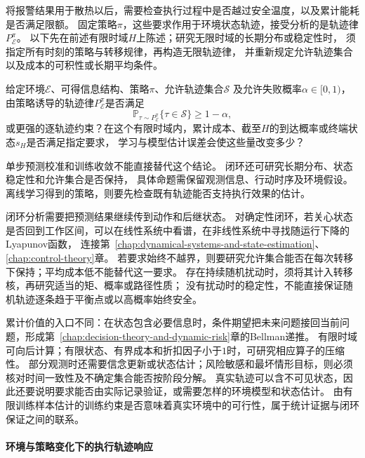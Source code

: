 将报警结果用于散热以后，需要检查执行过程中是否越过安全温度，以及累计能耗是否满足限额。
固定策略$\pi$，这些要求作用于环境状态轨迹，接受分析的是轨迹律$P_{\mathcal E}^{\pi}$。
以下先在前述有限时域$H$上陈述；研究无限时域的长期分布或稳定性时，
须指定所有时刻的策略与转移规律，再构造无限轨迹律，
并重新规定允许轨迹集合以及成本的可积性或长期平均条件。

\begin{mathproblem}[闭环轨迹能否满足长期要求]
  \label{question:future-closed-loop}
  给定环境$\mathcal E$、可得信息结构、策略$\pi$、允许轨迹集合$\mathcal S$
  及允许失败概率$\alpha\in[0,1)$，
  由策略诱导的轨迹律$P_{\mathcal E}^{\pi}$是否满足
  \[
    \mathbb P_{\tau\sim P_{\mathcal E}^{\pi}}\{\tau\in\mathcal S\}
    \geq1-\alpha,
  \]
  或更强的逐轨迹约束？在这个有限时域内，累计成本、截至$H$的到达概率或终端状态$s_H$是否满足指定要求，
  学习与模型估计误差会使这些量改变多少？
\end{mathproblem}

单步预测校准和训练收敛不能直接替代这个结论。
闭环还可研究长期分布、状态稳定性和允许集合是否保持，
具体命题需保留观测信息、行动时序及环境假设。
离线学习得到的策略，则要先检查既有轨迹能否支持执行效果的估计。

闭环分析需要把预测结果继续传到动作和后继状态。
对确定性闭环，若关心状态是否回到工作区间，可以在线性系统中看谱，在非线性系统中寻找随运行下降的Lyapunov函数，
连接第~\ref{chap:dynamical-systems-and-state-estimation}、\ref{chap:control-theory}章。
若要求始终不越界，则要研究允许集合能否在每次转移下保持；平均成本低不能替代这一要求。
存在持续随机扰动时，须将其计入转移核，再研究适当的矩、概率或路径性质；
没有扰动时的稳定性，不能直接保证随机轨迹逐条趋于平衡点或以高概率始终安全。

累计价值的入口不同：在状态包含必要信息时，条件期望把未来问题接回当前问题，形成第~\ref{chap:decision-theory-and-dynamic-risk}章的Bellman递推。
有限时域可向后计算；有限状态、有界成本和折扣因子小于$1$时，可研究相应算子的压缩性。
部分观测时还需要信念更新或状态估计；风险敏感和最坏情形目标，则必须核对时间一致性及不确定集合能否按阶段分解。
真实轨迹可以含不可见状态，因此还要说明要求能否由实际记录验证，或需要怎样的环境模型和状态估计。
由有限训练样本估计的训练约束是否意味着真实环境中的可行性，属于统计证据与闭环保证之间的联系。

\paragraph{环境与策略变化下的执行轨迹响应}
\label{sec:future-analysis-trajectory-perturbation}

